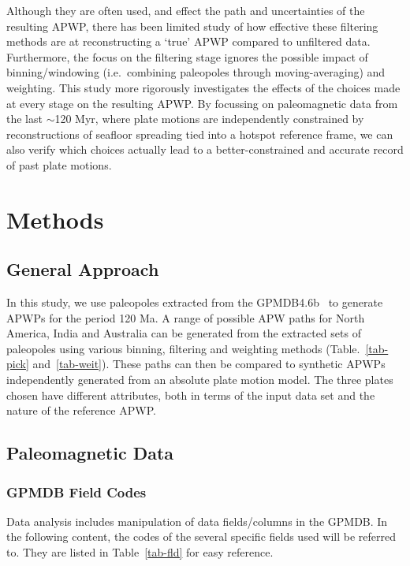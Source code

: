 Although they are often used, and effect the path and uncertainties of the
resulting APWP, there has been limited study of how effective these filtering
methods are at reconstructing a `true' APWP compared to unfiltered data.
Furthermore, the focus on the filtering stage ignores the possible impact of
binning/windowing (i.e.\ combining paleopoles through moving-averaging) and
weighting. This study more rigorously investigates the effects of the choices
made at every stage on the resulting APWP\@. By focussing on paleomagnetic data
from the last $\sim$120 Myr, where plate motions are independently constrained
by reconstructions of seafloor spreading tied into a hotspot reference frame, we
can also verify which choices actually lead to a better-constrained and accurate
record of past plate motions.


\section{Methods}

\subsection{General Approach}

In this study, we use paleopoles extracted from the GPMDB4.6b~\citep{M96,P05} to
generate APWPs for the period 120 Ma. A range of possible APW paths
for North America, India and Australia can be generated from the extracted sets
of paleopoles using various binning, filtering and weighting methods
(Table.~\ref{tab-pick} and~\ref{tab-weit}). These paths can then be compared to
synthetic APWPs independently generated from an absolute plate motion model. The
three plates chosen have different attributes, both in terms of the input data
set and the nature of the reference APWP\@.

\subsection{Paleomagnetic Data}

\subsubsection{GPMDB Field Codes}

Data analysis includes manipulation of data fields/columns in the GPMDB\@. In
the following content, the codes of the several specific fields used will be
referred to. They are listed in Table~\ref{tab-fld} for easy reference.

